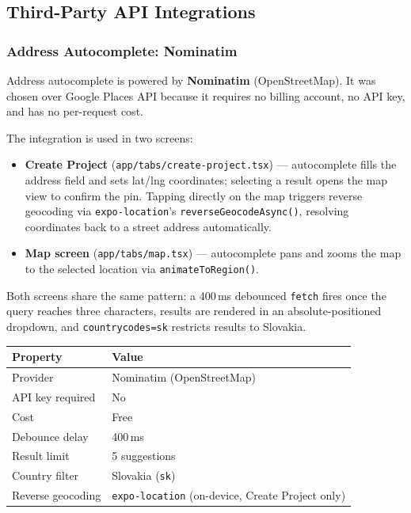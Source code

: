 \documentclass[12pt,a4paper]{article}
\begin{document}
\subsection{Third-Party API Integrations}

\subsubsection{Address Autocomplete: Nominatim}

Address autocomplete is powered by \textbf{Nominatim} (OpenStreetMap). It was chosen over Google Places API because it requires no billing account, no API key, and has no per-request cost.

The integration is used in two screens:

\begin{itemize}
    \item \textbf{Create Project} (\texttt{app/tabs/create-project.tsx}) --- autocomplete fills the address field and sets lat/lng coordinates; selecting a result opens the map view to confirm the pin. Tapping directly on the map triggers reverse geocoding via \texttt{expo-location}'s \texttt{reverseGeocodeAsync()}, resolving coordinates back to a street address automatically.
    \item \textbf{Map screen} (\texttt{app/tabs/map.tsx}) --- autocomplete pans and zooms the map to the selected location via \texttt{animateToRegion()}.
\end{itemize}

Both screens share the same pattern: a 400\,ms debounced \texttt{fetch} fires once the query reaches three characters, results are rendered in an absolute-positioned dropdown, and \texttt{countrycodes=sk} restricts results to Slovakia.

\begin{tabular}{ll}
\toprule
\textbf{Property} & \textbf{Value} \\
\midrule
Provider          & Nominatim (OpenStreetMap) \\
API key required  & No \\
Cost              & Free \\
Debounce delay    & 400\,ms \\
Result limit      & 5 suggestions \\
Country filter    & Slovakia (\texttt{sk}) \\
Reverse geocoding & \texttt{expo-location} (on-device, Create Project only) \\
\bottomrule
\end{tabular}
\end{document}

